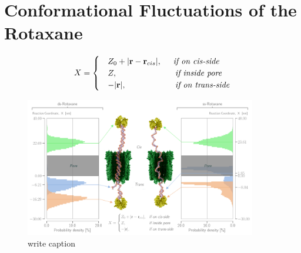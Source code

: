 \section{Conformational Fluctuations of the Rotaxane}

%
%
%

%

\begin{equation}
  X = \begin{cases}
        &Z_0 + |\textbf{r} - \textbf{r}_{cis}|, \hspace{0.5cm} \textit{if on cis-side}\\
        &Z, \hspace{2.5cm} \textit{if inside pore}\\
        &-|\textbf{r}|, \hspace{2.11cm} \textit{if on trans-side}
      \end{cases}
\end{equation}


\begin{figure}
\begin{center}
  \includegraphics[width=0.90\textwidth]{Figures/RotaxaneFluctuations.png}
  \caption{write caption}
\end{center}
\end{figure}
